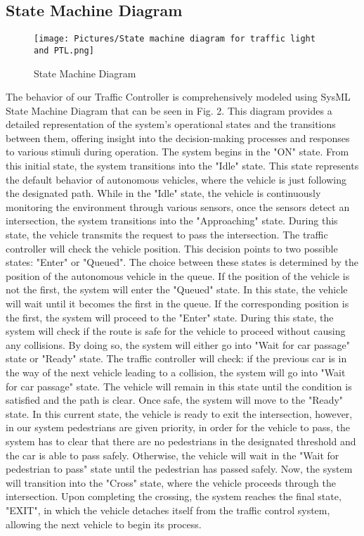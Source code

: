 \documentclass[conference]{IEEEtran}
\begin{document}
 
\subsection{State Machine Diagram}
\begin{figure*}[t]
    \centering
    \texttt{[image: Pictures/State machine diagram for traffic light and PTL.png]}
    \caption{State Machine Diagram}
    \label{fig:state_machine}
\end{figure*}


The behavior of our Traffic Controller is comprehensively modeled using SysML State Machine Diagram that can be seen in Fig. 2. This diagram provides a detailed representation of the system's operational states and the transitions between them, offering insight into the decision-making processes and responses to various stimuli during operation.
The system begins in the "ON" state. From this initial state, the system transitions into the "Idle" state. This state represents the default behavior of autonomous vehicles, where the vehicle is just following the designated path. While in the "Idle" state, the vehicle is continuously monitoring the environment through various sensors, once the sensors detect an intersection, the system transitions into the "Approaching" state. During this state, the vehicle transmits the request to pass the intersection. The traffic controller will check the vehicle position. This decision points to two possible states: "Enter" or "Queued". The choice between these states is determined by the position of the autonomous vehicle in the queue. If the position of the vehicle is not the first, the system will enter the "Queued" state. In this state, the vehicle will wait until it becomes the first in the queue. 
If the corresponding position is the first, the system will proceed to the "Enter" state. During this state, the system will check if the route is safe for the vehicle to proceed without causing any collisions. By doing so, the system will either go into "Wait for car passage" state or "Ready" state. The traffic controller will check: if the previous car is in the way of the next vehicle leading to a collision, the system will go into "Wait for car passage" state. The vehicle will remain in this state until the condition is satisfied and the path is clear. Once safe, the system will move to the "Ready" state. In this current state, the vehicle is ready to exit the intersection, however, in our system pedestrians are given priority, in order for the vehicle to pass, the system has to clear that there are no pedestrians in the designated threshold and the car is able to pass safely. Otherwise, the vehicle will wait in the "Wait for pedestrian to pass" state until the pedestrian has passed safely. Now, the system will transition into the "Cross" state, where the vehicle proceeds through the intersection. Upon completing the crossing, the system reaches the final state, "EXIT", in which the vehicle detaches itself from the traffic control system, allowing the next vehicle to begin its process.
\end{document}
